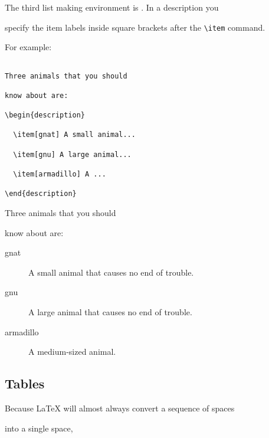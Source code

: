 \egend



The third list making environment is .  In a description you

specify the item labels inside square brackets after the \verb|\item| command.

For example:

\egstart

\begin{verbatim}

Three animals that you should

know about are:

\begin{description}

  \item[gnat] A small animal...

  \item[gnu] A large animal...

  \item[armadillo] A ...

\end{description}

\end{verbatim}

\egmid%

Three animals that you should

know about are:

\begin{description}

  \item[gnat] A small animal that causes no end of trouble.

  \item[gnu] A large animal that causes no end of trouble.

  \item[armadillo] A medium-sized animal.

\end{description}

\egend



\subsection{Tables}



Because \LaTeX{} will almost always convert a sequence of spaces

into a single space,

